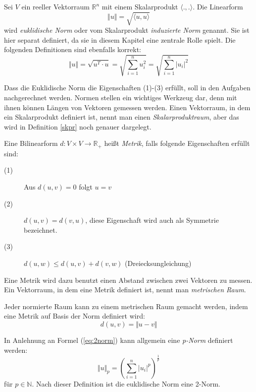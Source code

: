\begin{definition}
Sei $V$ ein reeller Vektorraum $\mathbb{R}^n$ mit einem Skalarprodukt $\langle .,.\rangle$. Die Linearform 
\[
\Vert u \Vert = \sqrt{\langle u,u \rangle}
\]
wird \textsl{euklidische Norm} oder vom Skalarprodukt \textsl{induzierte Norm} genannt. Sie ist hier separat definiert, da sie in diesem Kapitel eine zentrale Rolle spielt. Die folgenden Definitionen sind ebenfalls korrekt:
\begin{equation}\label{eq:2norm}
\Vert u \Vert = \sqrt{u^T \cdot u} = \sqrt{\sum_{i=1}^{n} u_i^2}= \sqrt{\sum_{i=1}^{n} \vert u_i \vert^2}
\end{equation}
\end{definition}

Dass die Euklidische Norm die Eigenschaften (1)-(3) erfüllt, soll in den Aufgaben nachgerechnet werden. Normen stellen ein wichtiges Werkzeug dar, denn mit ihnen können Längen von Vektoren gemessen werden. Einen Vektorraum, in dem ein Skalarprodukt definiert ist, nennt man einen \textsl{Skalarproduktraum}, aber das wird in Definition \ref{skpr} noch genauer dargelegt.

\begin{definition}
Eine Bilinearform $d : V\times V \longrightarrow \mathbb{R}_+$ heißt \textsl{Metrik}, falls folgende Eigenschaften erfüllt sind:
\begin{description}
\item[(1)] Aus $d(u,v) = 0$ folgt $u=v$
\item[(2)] $d(u,v) = d(v,u)$, diese Eigenschaft wird auch als Symmetrie bezeichnet.
\item[(3)] $d(u,w) \le d(u,v) + d(v,w)$ (Dreiecksungleichung)
\end{description}
\end{definition}

Eine Metrik wird dazu benutzt einen Abstand zwischen zwei Vektoren zu messen. Ein Vektorraum, in dem eine Metrik definiert ist, nennt man \textsl{metrischen Raum}. 

\begin{definition}
Jeder normierte Raum kann zu einem metrischen Raum gemacht werden, indem eine Metrik auf Basis der Norm definiert wird:
\[
d(u,v) = \Vert u-v \Vert
\]
\end{definition}

\begin{definition}
In Anlehnung an Formel (\ref{eq:2norm}) kann allgemein eine \textsl{p-Norm} definiert werden:
\[
\Vert u \Vert_p = \left( \sum_{i=1}^{n} \vert u_i \vert^p \right)^{\frac{1}{p}}
\]
für $p\in \mathbb{N}$. Nach dieser Definition ist die euklidische Norm eine 2-Norm. 
\end{definition}

